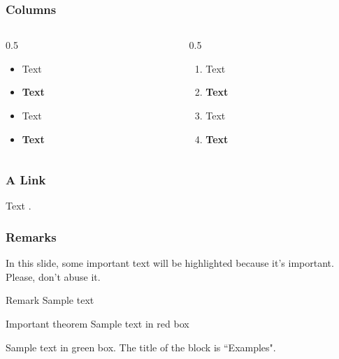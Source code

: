 \documentclass{beamer}
\begin{document}
\begin{frame}
\frametitle{Columns}

\begin{columns}[onlytextwidth]
	\begin{column}{0.5\textwidth}
		\begin{itemize}
			\item Text
			\item \textbf{Text}
			\item \textcolor{azulUC3M}{Text}
			\item \textcolor{azulUC3M}{\textbf{Text}}
		\end{itemize}
	\end{column}

	\begin{column}{0.5\textwidth}
			\begin{enumerate}
			\item Text
			\item \textbf{Text}
			\item \textcolor{azulUC3M}{Text}
			\item \textcolor{azulUC3M}{\textbf{Text}}
		\end{enumerate}
	\end{column}
\end{columns}
\end{frame}

\begin{frame}
\frametitle{A Link}

Text \href{https://www.uc3m.es}{}.
\end{frame}

\begin{frame}
\frametitle{Remarks}

In this slide, some important text will be
\alert{highlighted} because it's important.
Please, don't abuse it.

\begin{block}{Remark}
	Sample text
\end{block}

\begin{alertblock}{Important theorem}
	Sample text in red box
\end{alertblock}

\begin{examples}
	Sample text in green box. The title of the block is ``Examples".
\end{examples}
\end{frame}
\end{document}
